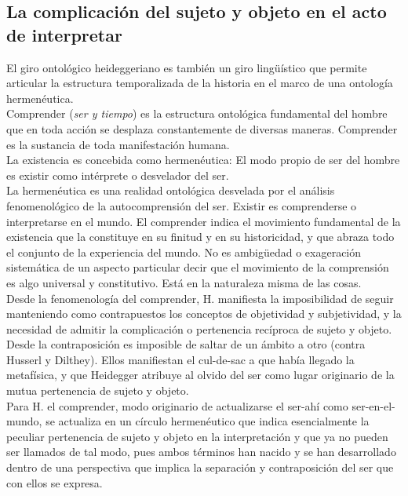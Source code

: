\documentclass[a4paper, 11pt, twocolumn, spanish]{article}
\begin{document}
\subsection{La complicación del sujeto y objeto en el acto de interpretar}
\label{sec:orgf246c6a}
El giro ontológico heideggeriano es también un giro lingüístico que
permite articular la estructura temporalizada de la historia en el
marco de una ontología hermenéutica.\\[0pt]
Comprender (\emph{ser y tiempo}) es la estructura ontológica fundamental
del hombre que en toda acción se desplaza constantemente de diversas
maneras. Comprender es la sustancia de toda manifestación humana.\\[0pt]
La existencia es concebida como hermenéutica: El modo propio de ser
del hombre es existir como intérprete o desvelador del ser.\\[0pt]

La hermenéutica es una realidad ontológica desvelada por el análisis
fenomenológico de la autocomprensión del ser. Existir es comprenderse
o interpretarse en el mundo.  El comprender indica el movimiento
fundamental de la existencia que la constituye en su finitud y en su
historicidad, y que abraza todo el conjunto de la experiencia del
mundo. No es ambigüedad o exageración sistemática de un aspecto
particular decir que el movimiento de la comprensión es algo universal
y constitutivo. Está en la naturaleza misma de las cosas.\\[0pt]

Desde la fenomenología del comprender, H. manifiesta la imposibilidad
de seguir manteniendo como contrapuestos los conceptos de objetividad
y subjetividad, y la necesidad de admitir la complicación o
pertenencia recíproca de sujeto y objeto. Desde la contraposición es
imposible de saltar de un ámbito a otro (contra Husserl y
Dilthey). Ellos manifiestan el cul-de-sac a que había llegado la
metafísica, y que Heidegger atribuye al olvido del ser como lugar
originario de la mutua pertenencia de sujeto y objeto.\\[0pt]
Para H. el comprender, modo originario de actualizarse el ser-ahí como
ser-en-el-mundo, se actualiza en un círculo hermenéutico que indica
esencialmente la peculiar pertenencia de sujeto y objeto en la
interpretación y que ya no pueden ser llamados de tal modo, pues ambos
términos han nacido y se han desarrollado dentro de una perspectiva
que implica la separación y contraposición del ser que con ellos se
expresa.
\end{document}
